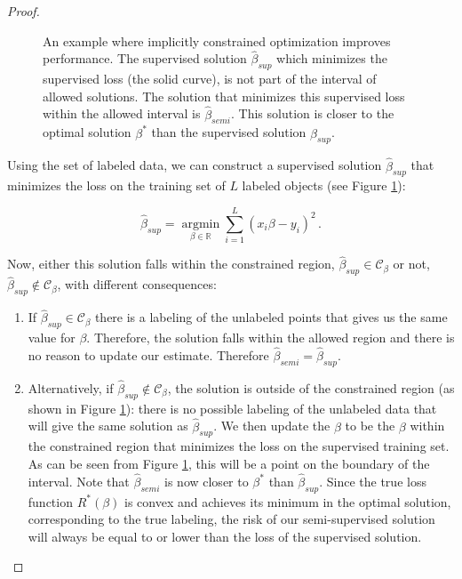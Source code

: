 \documentclass[twoside]{memoir}\usepackage[]{graphicx}\usepackage{xcolor}
\newenvironment{knitrout}{}{} %
\newcommand{\Cb}{\mathcal{C}_{\beta}}
\newcommand{\Nlab}{L}
\begin{document}
\begin{proof}
\begin{knitrout}
\begin{figure}
{}

\caption{An example where implicitly constrained optimization improves performance. The supervised solution $\hat{\beta}_{sup}$ which minimizes the supervised loss (the solid curve), is not part of the interval of allowed solutions. The solution that minimizes this supervised loss within the allowed interval is $\hat{\beta}_{semi}$. This solution is closer to the optimal solution ${\beta}^{\ast}$ than the supervised solution $\hat{\beta}_{sup}$.}\label{fig:constrainedproblem}
\end{figure}


\end{knitrout}

Using the set of labeled data, we can construct a supervised solution $\hat{\beta}_{sup}$ that minimizes the loss on the training set of $\Nlab$ labeled objects (see Figure \ref{fig:constrainedproblem}):

\begin{equation} \label{supervisedsolution}
\hat{\beta}_{sup} = \operatorname*{argmin}_{\beta \in \mathbb{R}} \sum_{i=1}^{\Nlab} (x_i \beta - y_i)^2 \, .
\end{equation}

Now, either this solution falls within the constrained region, $\hat{\beta}_{sup} \in \Cb$ or not, $\hat{\beta}_{sup} \notin \Cb$, with different consequences:

\begin{enumerate}
  \item If $\hat{\beta}_{sup} \in \Cb$ there is a labeling of the unlabeled points that gives us the same value for $\beta$. Therefore, the solution falls within the allowed region and there is no reason to update our estimate. Therefore $\hat{\beta}_{semi}=\hat{\beta}_{sup}$.
  \item Alternatively, if $\hat{\beta}_{sup} \notin  \Cb$, the solution is outside of the constrained region (as shown in Figure \ref{fig:constrainedproblem}): there is no possible labeling of the unlabeled data that will give the same solution as $\hat{\beta}_{sup}$. We then update the $\beta$ to be the $\beta$ within the constrained region that minimizes the loss on the supervised training set. As can be seen from Figure \ref{fig:constrainedproblem}, this will be a point on the boundary of the interval. Note that $\hat{\beta}_{semi}$ is now closer to $\beta^{*}$ than $\hat{\beta}_{sup}$. Since the true loss function $R^*(\beta)$ is convex  and achieves its minimum in the optimal solution, corresponding to the true labeling, the risk of our semi-supervised solution will always be equal to or lower than the loss of the supervised solution.
\end{enumerate}


\end{proof}
\end{document}
